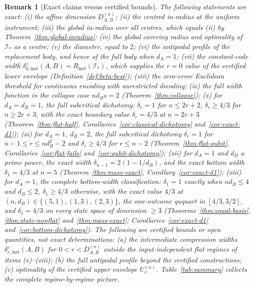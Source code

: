 \documentclass[11pt,a4paper]{article}
\newtheorem{remark}[theorem]{Remark}
\begin{document}
\begin{remark}[Exact claims versus certified bounds]
\label{rem:exact-vs-certified}
The following statements are exact: (i) the affine dimension $D_{A,B}^{(n)}$; (ii) the centred in-radius at the uniform instrument; (iii) the global in-radius over all centres, which equals (ii) by Theorem~\ref{thm:global-inradius}; (iv) the global covering radius and optimality of $\mathcal I_*$ as a centre; (v) the diameter, equal to $2$; (vi) the antipodal profile of the replacement body, and hence of the full body when $d_A=1$; (vii) the constant-code width $\delta_{0,\mathrm{inst}}^{\diamond}(A,B)=R_{\mathrm{inst}}(\mathcal I_*)$, which supplies the $r=0$ value of the certified lower envelope (Definition~\ref{def:beta-best}); (viii) the zero-error Euclidean threshold for continuous encoding with unrestricted decoding; (ix) the full width function in the collapse case $nd_Bs=2$ (Theorem~\ref{thm:collapse}); (x) for $d_A=d_B=1$, the full subcritical dichotomy: $\delta_r=1$ for $n\le2r+2$, $\delta_r\ge4/3$ for $n\ge2r+3$, with the exact boundary value $\delta_r=4/3$ at $n=2r+3$ (Theorem~\ref{thm:flat-half}, Corollaries~\ref{cor:classical-dichotomy} and~\ref{cor:exact-d1}); (xi) for $d_A=1$, $d_B=2$, the full subcritical dichotomy $\delta_r=1$ for $n-1\le r\le nd_B^2-2$ and $\delta_r\ge4/3$ for $r\le n-2$ (Theorem~\ref{thm:flat-qubit}, Corollaries~\ref{cor:flat-fails} and~\ref{cor:qubit-dichotomy}); (xii) for $d_A=1$ and $d_B$ a prime power, the exact width $\delta_{n-1}=2(1-1/d_B)$, and the exact bottom width $\delta_1=4/3$ at $n=5$ (Theorem~\ref{thm:mass-exact}, Corollary~\ref{cor:exact-d1}); (xiii) for $d_A=1$, the complete bottom-width classification: $\delta_1=1$ exactly when $nd_B\le4$ and $d_B\le2$, $\delta_1\ge4/3$ otherwise, with the exact value $4/3$ at $(n,d_B)\in\{(5,1),(1,3),(2,3)\}$, the one-outcome ququart in $[4/3,3/2]$, and $\delta_1=4/3$ on every state space of dimension $\ge3$ (Theorems~\ref{thm:equal-basis}, \ref{thm:state-nonflat} and~\ref{thm:mass-exact}; Corollaries~\ref{cor:exact-d1} and~\ref{cor:bottom-dichotomy}). The following are certified bounds or open quantities, not exact determinations: (a) the intermediate compression widths $\delta_{r,\mathrm{inst}}^{\diamond}(A,B)$ for $0<r<D_{A,B}^{(n)}$ outside the input-independent flat regimes of items (x)--(xiii); (b) the full antipodal profile beyond the certified constructions; (c) optimality of the certified upper envelope $U_r^{(n)}$. Table~\ref{tab:summary} collects the complete regime-by-regime picture.
\end{remark}
\end{document}
